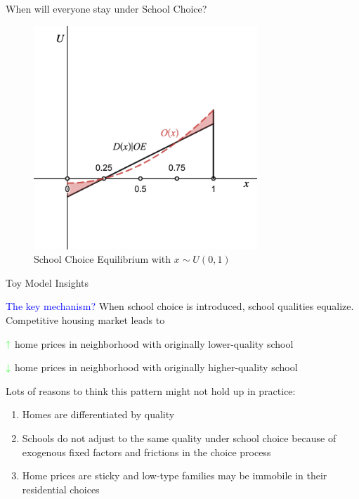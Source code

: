 \documentclass[notes,11pt, aspectratio=169]{beamer}
\newenvironment{wideitemize}{\itemize\addtolength{\itemsep}{10pt}}{\enditemize}
\begin{document}
\begin{frame}{When will everyone stay under School Choice?}
\begin{figure}
\centering
\includegraphics[width=0.75\textwidth]{figures/school_choice.png}
\caption{School Choice Equilibrium with $x \sim U(0,1)$}
\end{figure}
\end{frame}

\begin{frame}{Toy Model Insights}
\begin{wideitemize}
\item \textcolor{blue}{The key mechanism?} When school choice is introduced, school qualities equalize. Competitive housing market leads to
\begin{wideitemize}
\item $\textcolor{green}{\uparrow}$ home prices in neighborhood with originally lower-quality school
\item $\textcolor{green}{\downarrow}$ home prices in neighborhood with originally higher-quality school
\end{wideitemize}
\item Lots of reasons to think this pattern might not hold up in practice:
\begin{enumerate}
    \item Homes are differentiated by quality
    \item Schools do not adjust to the same quality under school choice because of exogenous fixed factors and frictions in the choice process
    \item Home prices are sticky and low-type families may be immobile in their residential choices
\end{enumerate} 
\end{wideitemize}
\end{frame}
\end{document}
